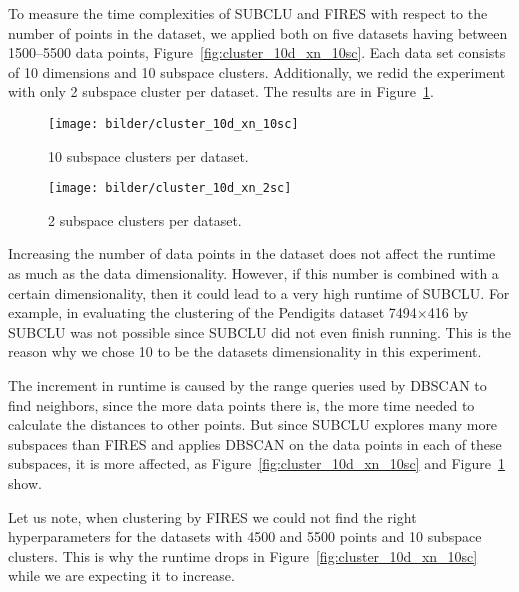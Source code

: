 To measure the time complexities of SUBCLU and FIRES with respect to the number of points in the dataset, we applied both on five datasets having between 1500--5500 data points, Figure~\ref{fig:cluster_10d_xn_10sc}. Each data set consists of 10 dimensions and 10 subspace clusters. Additionally, we redid the experiment with only 2 subspace cluster per dataset. The results are in Figure~\ref{fig:cluster_10d_xn_2sc}.
\begin{figure}[H]
	\centering
	\begin{minipage}{0.5\textwidth}
		\centering
		\texttt{[image: bilder/cluster\_10d\_xn\_10sc]}
		\caption{10 subspace clusters per dataset.}
		\label{fig:cluster_10d_xn_10sc}
	\end{minipage}\hfill
	\begin{minipage}{0.5\textwidth}
		\centering
		\texttt{[image: bilder/cluster\_10d\_xn\_2sc]}
		\caption{2 subspace clusters per dataset.}
		\label{fig:cluster_10d_xn_2sc}
	\end{minipage}
\end{figure}
Increasing the number of data points in the dataset does not affect the runtime as much as the data dimensionality. However, if this number is combined with a certain dimensionality, then it could lead to a very high runtime of SUBCLU. For example, in \citep{10.14778/1687627.1687770} evaluating the clustering of the Pendigits dataset 7494$\times$416 by SUBCLU was not possible since SUBCLU did not even finish running. This is the reason why we chose 10 to be the datasets dimensionality in this experiment.

The increment in runtime is caused by the range queries used by DBSCAN to find neighbors, since the more data points there is, the more time needed to calculate the distances to other points. But since SUBCLU explores many more subspaces than FIRES and applies DBSCAN on the data points in each of these subspaces, it is more affected, as Figure~\ref{fig:cluster_10d_xn_10sc} and Figure~\ref{fig:cluster_10d_xn_2sc} show. 

Let us note, when clustering by FIRES we could not find the right hyperparameters for the datasets with 4500 and 5500 points and 10 subspace clusters. This is why the runtime drops in Figure~\ref{fig:cluster_10d_xn_10sc} while we are expecting it to increase.

